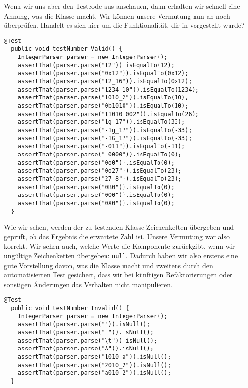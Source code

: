 Wenn wir uns aber den Testcode aus  anschauen, dann erhalten wir schnell eine Ahnung, was die Klasse macht. Wir können unsere Vermutung nun an  noch überprüfen. Handelt es sich hier um die Funktionalität, die in  vorgestellt wurde?

\begin{lstlisting}[caption={\klasse{IntegerParser} -- Test auf Validität},label=\lstlbl{integerparser-test1}]
  @Test
  public void testNumber_Valid() {
    IntegerParser parser = new IntegerParser();
    assertThat(parser.parse("12")).isEqualTo(12);
    assertThat(parser.parse("0x12")).isEqualTo(0x12);
    assertThat(parser.parse("12_16")).isEqualTo(0x12);
    assertThat(parser.parse("1234_10")).isEqualTo(1234);
    assertThat(parser.parse("1010_2")).isEqualTo(10);
    assertThat(parser.parse("0b1010")).isEqualTo(10);
    assertThat(parser.parse("11010_002")).isEqualTo(26);
    assertThat(parser.parse("1g_17")).isEqualTo(33);
    assertThat(parser.parse("-1g_17")).isEqualTo(-33);
    assertThat(parser.parse("-1G_17")).isEqualTo(-33);
    assertThat(parser.parse("-011")).isEqualTo(-11);
    assertThat(parser.parse("-0000")).isEqualTo(0);
    assertThat(parser.parse("0o0")).isEqualTo(0);
    assertThat(parser.parse("0o27")).isEqualTo(23);
    assertThat(parser.parse("27_8")).isEqualTo(23);
    assertThat(parser.parse("0B0")).isEqualTo(0);
    assertThat(parser.parse("0O0")).isEqualTo(0);
    assertThat(parser.parse("0X0")).isEqualTo(0);
  }
\end{lstlisting}

Wie wir sehen, werden der zu testenden Klasse Zeichenketten übergeben und geprüft, ob das Ergebnis die erwartete Zahl ist. Unsere Vermutung war also korrekt. Wir sehen auch, welche Werte die Komponente zurückgibt, wenn wir ungültige Zeichenketten übergeben: \texttt{null}. Dadurch haben wir also erstens eine gute Vorstellung davon, was die Klasse macht und zweitens durch den automatisierten Test gesichert, dass wir bei künftigen Refaktorierungen oder sonstigen Änderungen das Verhalten nicht manipulieren.

\begin{lstlisting}[caption={\klasse{IntegerParser} -- Test auf Invalidität},label=\lstlbl{integerparser-test2}]
  @Test
  public void testNumber_Invalid() {
    IntegerParser parser = new IntegerParser();
    assertThat(parser.parse("")).isNull();
    assertThat(parser.parse(" ")).isNull();
    assertThat(parser.parse("\t")).isNull();
    assertThat(parser.parse("A")).isNull();
    assertThat(parser.parse("1010_a")).isNull();
    assertThat(parser.parse("2010_2")).isNull();
    assertThat(parser.parse("a010_2")).isNull();
  }
\end{lstlisting}

